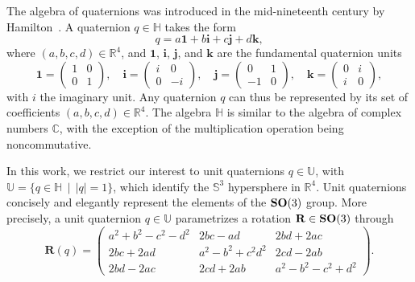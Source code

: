 The algebra of quaternions was introduced in the mid-nineteenth century by Hamilton~\cite{rosenfeld_history_1988}. A quaternion $q\in\mathbb{H}$ takes the form
\begin{equation}
    \label{eq:quaternion-definition}
    q =  a\boldsymbol{1} + b\boldsymbol{i} + c\boldsymbol{j} + d\boldsymbol{k},
\end{equation}
where $(a,b,c,d)\in\mathbb{R}^4$, and $\boldsymbol{1}$, $\boldsymbol{i}$, $\boldsymbol{j}$, and $\boldsymbol{k}$ are the fundamental quaternion units
\begin{equation}
    \label{eq:quaternion-units}
    \boldsymbol{1} = \begin{pmatrix} 1 & 0 \\ 0 & 1 \end{pmatrix}, \quad
    \boldsymbol{i} = \begin{pmatrix} i & 0 \\ 0 & -i \end{pmatrix}, \quad
    \boldsymbol{j} = \begin{pmatrix} 0 & 1 \\ -1 & 0 \end{pmatrix}, \quad
    \boldsymbol{k} = \begin{pmatrix} 0 & i \\ i & 0 \end{pmatrix},
\end{equation}
with $i$ the imaginary unit. Any quaternion $q$ can thus be represented by its set of coefficients $(a,b,c,d)\in\mathbb{R}^4$. The algebra $\mathbb{H}$ is similar to the algebra of complex numbers $\mathbb{C}$, with the exception of the multiplication operation being noncommutative.

In this work, we restrict our interest to unit quaternions $q\in\mathbb{U}$, with  $\mathbb{U}=\big\{q\in\mathbb{H} \; \, | \; \,\lvert q \rvert =1\big\}$, which identify the $\mathbb{S}^3$ hypersphere in  $\mathbb{R}^4$. Unit quaternions concisely and elegantly represent the elements of the $\mathrm{\mathbf{SO}}(3)$ group. More precisely, a unit quaternion $q\in\mathbb{U}$ parametrizes a rotation $\mathbf{R}\in\mathrm{\mathbf{SO}}(3)$ through
\begin{equation}
    \mathbf{R}(q) =\begin{pmatrix}
    a^2+b^2-c^2-d^2 & 2bc-ad & 2bd+2ac  \\
    2bc+2ad & a^2-b^2+c^2d^2 & 2cd-2ab \\
    2bd-2ac & 2cd+2ab & a^2-b^2-c^2+d^2
    \end{pmatrix}.
    \label{eq:quaternion-rotation-matrix}
\end{equation}

